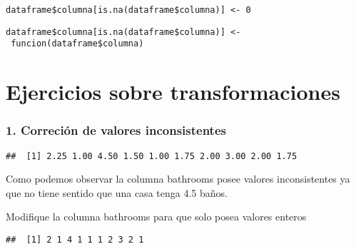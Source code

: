 \documentclass[]{article}
\newenvironment{Shaded}{\begin{snugshade}}{\end{snugshade}}
\newcommand{\CommentTok}[1]{\textcolor[rgb]{0.56,0.35,0.01}{\textit{#1}}}
\newcommand{\DecValTok}[1]{\textcolor[rgb]{0.00,0.00,0.81}{#1}}
\newcommand{\KeywordTok}[1]{\textcolor[rgb]{0.13,0.29,0.53}{\textbf{#1}}}
\newcommand{\NormalTok}[1]{#1}
\newcommand{\OperatorTok}[1]{\textcolor[rgb]{0.81,0.36,0.00}{\textbf{#1}}}
\newcommand{\StringTok}[1]{\textcolor[rgb]{0.31,0.60,0.02}{#1}}
\begin{document}
\texttt{dataframe\$columna{[}is.na(dataframe\$columna){]}\ \textless{}-\ 0}

\texttt{dataframe\$columna{[}is.na(dataframe\$columna){]}\ \textless{}-\ funcion(dataframe\$columna)}

\hypertarget{ejercicios-sobre-transformaciones}{%
\section{Ejercicios sobre
transformaciones}\label{ejercicios-sobre-transformaciones}}

\hypertarget{correcion-de-valores-inconsistentes}{%
\subsubsection{1. Correción de valores
inconsistentes}\label{correcion-de-valores-inconsistentes}}

\begin{Shaded}
\end{Shaded}

\begin{verbatim}
##  [1] 2.25 1.00 4.50 1.50 1.00 1.75 2.00 3.00 2.00 1.75
\end{verbatim}

Como podemos observar la columna bathrooms posee valores inconsistentes
ya que no tiene sentido que una casa tenga 4.5 baños.

Modifique la columna bathrooms para que solo posea valores enteros

\begin{Shaded}
\end{Shaded}

\begin{verbatim}
##  [1] 2 1 4 1 1 1 2 3 2 1
\end{verbatim}
\end{document}
